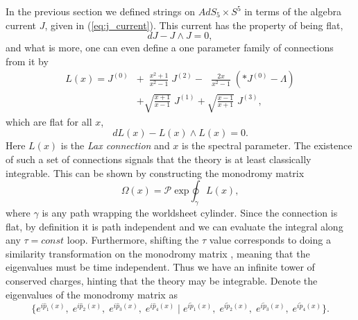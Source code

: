 In the previous section we defined strings on $AdS_5 \times S^5$ in terms of the algebra current $J$, given in (\ref{eq:j_current}). This current has the property of being flat,
\begin{equation}
	dJ - J \wedge J = 0,
\end{equation}
and what is more, one can even define a one parameter family of connections from it by \cite{sakura}
\begin{equation}
\begin{split}
	L(x) = J^{(0)} & + \,\,\, \frac{x^2 + 1}{x^2 - 1} \; J^{(2)}  - \,\,\,\, \frac{2x}{x^2 - 1} \; \left( * J^{(0)} - \Lambda \right) \\ 
	 & + \sqrt{\frac{x+1}{x-1}} \; J^{(1)} + \sqrt{\frac{x-1}{x+1}} \; J^{(3)},
\end{split}
\end{equation} 
which are flat for all $x$,
\begin{equation}
	dL(x) - L(x) \wedge L(x) = 0.
\end{equation}
Here $L(x)$ is the \emph{Lax connection} and $x$ is the spectral parameter. The existence of such a set of connections signals that the theory is at least classically integrable. This can be shown by constructing the monodromy matrix
\begin{equation}
	\Omega(x) = \mathcal{P} \; \mathrm{exp} \oint_\gamma L(x),
\end{equation}
where $\gamma$ is any path wrapping the worldsheet cylinder. Since the connection is flat, by definition it is path independent and we can evaluate the integral along any $\tau = const$ loop. Furthermore, shifting the $\tau$ value corresponds to doing a similarity transformation on the monodromy matrix \cite{gromov_quasiclassical}, meaning that the eigenvalues must be time independent. Thus we have an infinite tower of conserved charges, hinting that the theory may be integrable. Denote the eigenvalues of the monodromy matrix as
\begin{equation}
	\{ e^{i\hat{p}_1(x)}, \; e^{i\hat{p}_2(x)}, \; e^{i\hat{p}_3(x)}, \; e^{i\hat{p}_4(x)} \; | \; e^{i\tilde{p}_1(x)}, \; e^{i\tilde{p}_2(x)}, \; e^{i\tilde{p}_3(x)}, \; e^{i\tilde{p}_4(x)} \}.
\end{equation} 
